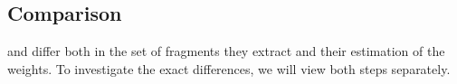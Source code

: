 %
%
%
%
%
%
%






\subsection{Comparison}
\dops{} and \ddop{} differ both in the set of fragments they extract and their estimation of the weights. To investigate the exact differences, we will view both steps separately.

